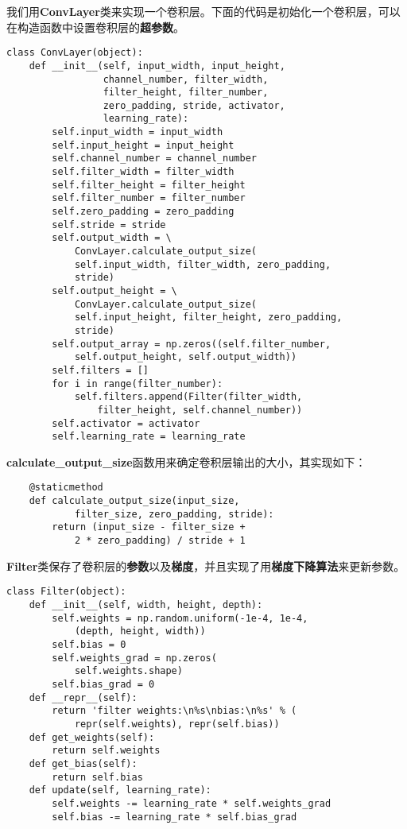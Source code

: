 我们用\textbf{ConvLayer}类来实现一个卷积层。下面的代码是初始化一个卷积层，可以在构造函数中设置卷积层的\textbf{超参数}。
\begin{lstlisting}
class ConvLayer(object):
    def __init__(self, input_width, input_height, 
                 channel_number, filter_width, 
                 filter_height, filter_number, 
                 zero_padding, stride, activator,
                 learning_rate):
        self.input_width = input_width
        self.input_height = input_height
        self.channel_number = channel_number
        self.filter_width = filter_width
        self.filter_height = filter_height
        self.filter_number = filter_number
        self.zero_padding = zero_padding
        self.stride = stride
        self.output_width = \
            ConvLayer.calculate_output_size(
            self.input_width, filter_width, zero_padding,
            stride)
        self.output_height = \
            ConvLayer.calculate_output_size(
            self.input_height, filter_height, zero_padding,
            stride)
        self.output_array = np.zeros((self.filter_number, 
            self.output_height, self.output_width))
        self.filters = []
        for i in range(filter_number):
            self.filters.append(Filter(filter_width, 
                filter_height, self.channel_number))
        self.activator = activator
        self.learning_rate = learning_rate
\end{lstlisting}

\textbf{calculate\_output\_size}函数用来确定卷积层输出的大小，其实现如下：
\begin{lstlisting}
    @staticmethod
    def calculate_output_size(input_size,
            filter_size, zero_padding, stride):
        return (input_size - filter_size + 
            2 * zero_padding) / stride + 1
\end{lstlisting}

\textbf{Filter}类保存了卷积层的\textbf{参数}以及\textbf{梯度}，并且实现了用\textbf{梯度下降算法}来更新参数。
\begin{lstlisting}
class Filter(object):
    def __init__(self, width, height, depth):
        self.weights = np.random.uniform(-1e-4, 1e-4,
            (depth, height, width))
        self.bias = 0
        self.weights_grad = np.zeros(
            self.weights.shape)
        self.bias_grad = 0
    def __repr__(self):
        return 'filter weights:\n%s\nbias:\n%s' % (
            repr(self.weights), repr(self.bias))
    def get_weights(self):
        return self.weights
    def get_bias(self):
        return self.bias
    def update(self, learning_rate):
        self.weights -= learning_rate * self.weights_grad
        self.bias -= learning_rate * self.bias_grad
\end{lstlisting}

